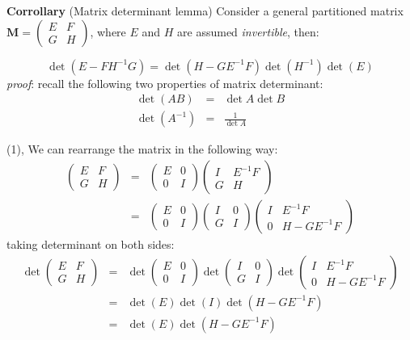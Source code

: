 \documentclass{article}
\begin{document}
\noindent
\textbf{Corrollary} (Matrix determinant lemma)
Consider a general partitioned matrix  $\textbf{M} = \begin{pmatrix} E & F \\ G & H \end{pmatrix}$, where $E$ and $H$ are assumed \textit{invertible}, then:
\newline

\begin{equation*}
\det{(E - F H^{-1} G)} = \det{(H - G E^{-1} F)} \det{(H^{-1})} \det{(E)}
\end{equation*}
\newline
\textit{proof}:
recall the following two properties of matrix determinant: 
\begin{eqnarray*}
\det{(AB)} &=& \det{A} \det{B} \\
\det{(A^{-1})} &=& \frac{1}{\det{A}}
\end{eqnarray*}

(1), We can rearrange the matrix in the following way:
\begin{eqnarray*}
\begin{pmatrix} E & F \\ G & H \end{pmatrix} &=& \begin{pmatrix}E & 0 \\ 0 & I \end{pmatrix} \begin{pmatrix} I & E^{-1} F \\ G & H \end{pmatrix} \\
&=& \begin{pmatrix}E & 0 \\ 0 & I \end{pmatrix} \begin{pmatrix} I & 0 \\ G & I \end{pmatrix} \begin{pmatrix} I & E^{-1} F \\ 0 & H - G E^{-1} F \end{pmatrix} 
\end{eqnarray*}
taking determinant on both sides:
\begin{eqnarray}
\det{\begin{pmatrix} E & F \\ G & H \end{pmatrix}} &=& \det{\begin{pmatrix} E & 0 \\ 0 & I \end{pmatrix}} \det{\begin{pmatrix} I & 0 \\ G & I \end{pmatrix}} \det{\begin{pmatrix} I & E^{-1} F \\ 0 & H - G E^{-1} F \end{pmatrix}} \nonumber \\
&=& \det{(E)} \det{(I)} \det{(H - G E^{-1} F)} \nonumber \\
&=& \det{(E)} \det{(H - G E^{-1} F)}
\label{eqn:part1}
\end{eqnarray}
\end{document}
